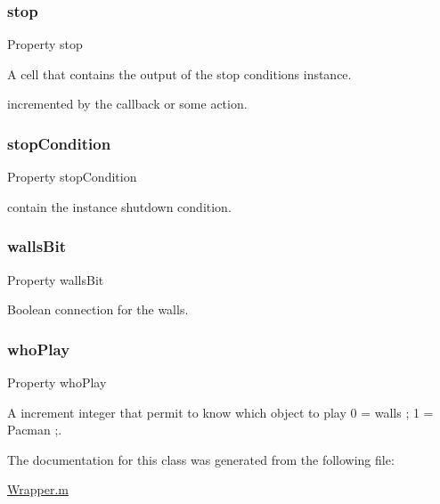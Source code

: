 \subsubsection{\texorpdfstring{stop}{stop}}
{\footnotesize\ttfamily Property stop}



A cell that contains the output of the stop conditions instance. 

incremented by the callback or some action. \mbox{\label{class_wrapper_a19a246dc459b20945f02106d6734fa4b}} 
\subsubsection{\texorpdfstring{stop\+Condition}{stopCondition}}
{\footnotesize\ttfamily Property stop\+Condition}



contain the instance shutdown condition. 

\mbox{\label{class_wrapper_a94dd71be012b98d496117309a20939b1}} 
\subsubsection{\texorpdfstring{walls\+Bit}{wallsBit}}
{\footnotesize\ttfamily Property walls\+Bit}



Boolean connection for the walls. 

\mbox{\label{class_wrapper_a19e8c1d68257003eba8e5a47c8302113}} 
\subsubsection{\texorpdfstring{who\+Play}{whoPlay}}
{\footnotesize\ttfamily Property who\+Play}



A increment integer that permit to know which object to play 0 = walls ; 1 = Pacman ;. 



The documentation for this class was generated from the following file\+:\begin{DoxyCompactItemize}
\item 
\hyperlink{_wrapper_8m}{Wrapper.\+m}\end{DoxyCompactItemize}
